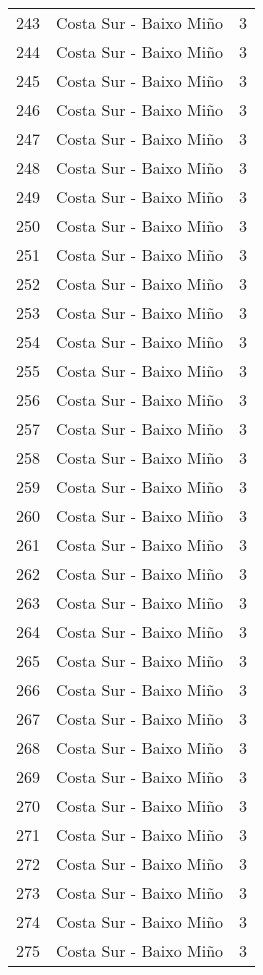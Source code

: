 \begin{table}[p]
\begin{tabular}{rlr}
  243 & Costa Sur - Baixo Miño &   3 \\ 
  244 & Costa Sur - Baixo Miño &   3 \\ 
  245 & Costa Sur - Baixo Miño &   3 \\ 
  246 & Costa Sur - Baixo Miño &   3 \\ 
  247 & Costa Sur - Baixo Miño &   3 \\ 
  248 & Costa Sur - Baixo Miño &   3 \\ 
  249 & Costa Sur - Baixo Miño &   3 \\ 
  250 & Costa Sur - Baixo Miño &   3 \\ 
  251 & Costa Sur - Baixo Miño &   3 \\ 
  252 & Costa Sur - Baixo Miño &   3 \\ 
  253 & Costa Sur - Baixo Miño &   3 \\ 
  254 & Costa Sur - Baixo Miño &   3 \\ 
  255 & Costa Sur - Baixo Miño &   3 \\ 
  256 & Costa Sur - Baixo Miño &   3 \\ 
  257 & Costa Sur - Baixo Miño &   3 \\ 
  258 & Costa Sur - Baixo Miño &   3 \\ 
  259 & Costa Sur - Baixo Miño &   3 \\ 
  260 & Costa Sur - Baixo Miño &   3 \\ 
  261 & Costa Sur - Baixo Miño &   3 \\ 
  262 & Costa Sur - Baixo Miño &   3 \\ 
  263 & Costa Sur - Baixo Miño &   3 \\ 
  264 & Costa Sur - Baixo Miño &   3 \\ 
  265 & Costa Sur - Baixo Miño &   3 \\ 
  266 & Costa Sur - Baixo Miño &   3 \\ 
  267 & Costa Sur - Baixo Miño &   3 \\ 
  268 & Costa Sur - Baixo Miño &   3 \\ 
  269 & Costa Sur - Baixo Miño &   3 \\ 
  270 & Costa Sur - Baixo Miño &   3 \\ 
  271 & Costa Sur - Baixo Miño &   3 \\ 
  272 & Costa Sur - Baixo Miño &   3 \\ 
  273 & Costa Sur - Baixo Miño &   3 \\ 
  274 & Costa Sur - Baixo Miño &   3 \\ 
  275 & Costa Sur - Baixo Miño &   3 \\ 

\end{tabular}
\end{table}
